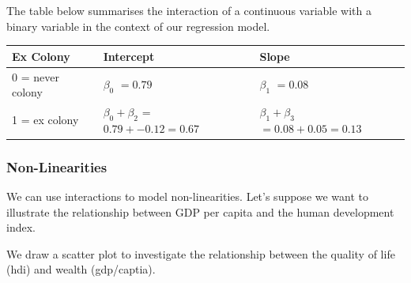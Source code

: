 \documentclass[]{article}
\theoremstyle{definition}
\theoremstyle{definition}
\theoremstyle{definition}
\theoremstyle{remark}
\begin{document}
The table below summarises the interaction of a continuous variable with
a binary variable in the context of our regression model.

\begin{longtable}[]{@{}lll@{}}
\toprule
\begin{minipage}[b]{0.26\columnwidth}\raggedright\strut
Ex Colony\strut
\end{minipage} & \begin{minipage}[b]{0.35\columnwidth}\raggedright\strut
Intercept\strut
\end{minipage} & \begin{minipage}[b]{0.30\columnwidth}\raggedright\strut
Slope\strut
\end{minipage}\tabularnewline
\midrule
\endhead
\begin{minipage}[t]{0.26\columnwidth}\raggedright\strut
0 = never colony\strut
\end{minipage} & \begin{minipage}[t]{0.35\columnwidth}\raggedright\strut
\(\beta_0\) \(= 0.79\)\strut
\end{minipage} & \begin{minipage}[t]{0.30\columnwidth}\raggedright\strut
\(\beta_1\) \(= 0.08\)\strut
\end{minipage}\tabularnewline
\begin{minipage}[t]{0.26\columnwidth}\raggedright\strut
1 = ex colony\strut
\end{minipage} & \begin{minipage}[t]{0.35\columnwidth}\raggedright\strut
\(\beta_0 + \beta_2\) = \(0.79 + -0.12 = 0.67\)\strut
\end{minipage} & \begin{minipage}[t]{0.30\columnwidth}\raggedright\strut
\(\beta_1 + \beta_3\) \(= 0.08 + 0.05 = 0.13\)\strut
\end{minipage}\tabularnewline
\bottomrule
\end{longtable}

\subsubsection{Non-Linearities}\label{non-linearities}

We can use interactions to model non-linearities. Let's suppose we want
to illustrate the relationship between GDP per capita and the human
development index.

We draw a scatter plot to investigate the relationship between the
quality of life (hdi) and wealth (gdp/captia).
\end{document}
